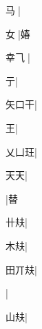 \begin{multicols}{2}
{{\cjk{}{\cnsym{}　}马{\cnxJzr{}}}\mktsJzrVerticalBar{}{\cjk{}{\cnsym{}　}{\cnsym{}　}{\cnsym{}　}}|{}\par
{\cjk{}{\cnsym{}　}女{\cnxJzr{}}}\mktsJzrVerticalBar{}{\cjk{}{\cnsym{}　}{\cnsym{}　}{\cnsym{}　}}|{\cjk{}媋}\par
{\cjk{}幸{\cnxHanaA{}⺄}{\cnjzr{}}}\mktsJzrVerticalBar{}{\cjk{}{\cnsym{}　}{\cnsym{}　}{\cnsym{}　}}|{}\par
{亍}\mktsJzrVerticalBar{}{\cjk{}{\cnsym{}　}{\cnsym{}　}{\cnsym{}　}}|{}\par
{\cjk{}矢口干}\mktsJzrVerticalBar{}{\cjk{}{\cnsym{}　}{\cnsym{}　}{\cnsym{}　}}|{}\par
{\cjk{}{\cnsym{}　}{\cnsym{}　}王}\mktsJzrVerticalBar{}{\cjk{}{\cnsym{}　}{\cnsym{}　}{\cnsym{}　}}|{}\par
{\cjk{}乂凵玨}|{}\par
{天天}|{}\par
{}\mktsJzrVerticalBar{}{\cjk{}{\cnsym{}　}{\cnsym{}　}{\cnsym{}　}}|{\cjk{}替}\par
{\cjk{}{\cnsym{}　}卄{\cnxa{}㚘}}\mktsJzrVerticalBar{}{\cjk{}{\cnsym{}　}{\cnsym{}　}{\cnsym{}　}}|{}\par
{\cjk{}{\cnsym{}　}木{\cnxa{}㚘}}\mktsJzrVerticalBar{}{\cjk{}{\cnsym{}　}{\cnsym{}　}{\cnsym{}　}}|{}\par
{\cjk{}田丌{\cnxa{}㚘}}|{}\par
{}\mktsJzrVerticalBar{}{\cjk{}{\cnsym{}　}{\cnsym{}　}{\cnsym{}　}}|{}\par
{\cjk{}{\cnsym{}　}山{\cnxa{}㚘}}\mktsJzrVerticalBar{}{\cjk{}{\cnsym{}　}{\cnsym{}　}{\cnsym{}　}}|{}\par
}
\end{multicols}
